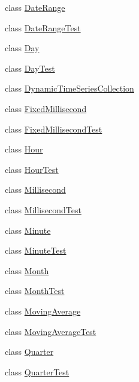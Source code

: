 \begin{DoxyCompactItemize}
\item 
class \mbox{\hyperlink{classorg_1_1jfree_1_1data_1_1time_1_1_date_range}{Date\+Range}}
\item 
class \mbox{\hyperlink{classorg_1_1jfree_1_1data_1_1time_1_1_date_range_test}{Date\+Range\+Test}}
\item 
class \mbox{\hyperlink{classorg_1_1jfree_1_1data_1_1time_1_1_day}{Day}}
\item 
class \mbox{\hyperlink{classorg_1_1jfree_1_1data_1_1time_1_1_day_test}{Day\+Test}}
\item 
class \mbox{\hyperlink{classorg_1_1jfree_1_1data_1_1time_1_1_dynamic_time_series_collection}{Dynamic\+Time\+Series\+Collection}}
\item 
class \mbox{\hyperlink{classorg_1_1jfree_1_1data_1_1time_1_1_fixed_millisecond}{Fixed\+Millisecond}}
\item 
class \mbox{\hyperlink{classorg_1_1jfree_1_1data_1_1time_1_1_fixed_millisecond_test}{Fixed\+Millisecond\+Test}}
\item 
class \mbox{\hyperlink{classorg_1_1jfree_1_1data_1_1time_1_1_hour}{Hour}}
\item 
class \mbox{\hyperlink{classorg_1_1jfree_1_1data_1_1time_1_1_hour_test}{Hour\+Test}}
\item 
class \mbox{\hyperlink{classorg_1_1jfree_1_1data_1_1time_1_1_millisecond}{Millisecond}}
\item 
class \mbox{\hyperlink{classorg_1_1jfree_1_1data_1_1time_1_1_millisecond_test}{Millisecond\+Test}}
\item 
class \mbox{\hyperlink{classorg_1_1jfree_1_1data_1_1time_1_1_minute}{Minute}}
\item 
class \mbox{\hyperlink{classorg_1_1jfree_1_1data_1_1time_1_1_minute_test}{Minute\+Test}}
\item 
class \mbox{\hyperlink{classorg_1_1jfree_1_1data_1_1time_1_1_month}{Month}}
\item 
class \mbox{\hyperlink{classorg_1_1jfree_1_1data_1_1time_1_1_month_test}{Month\+Test}}
\item 
class \mbox{\hyperlink{classorg_1_1jfree_1_1data_1_1time_1_1_moving_average}{Moving\+Average}}
\item 
class \mbox{\hyperlink{classorg_1_1jfree_1_1data_1_1time_1_1_moving_average_test}{Moving\+Average\+Test}}
\item 
class \mbox{\hyperlink{classorg_1_1jfree_1_1data_1_1time_1_1_quarter}{Quarter}}
\item 
class \mbox{\hyperlink{classorg_1_1jfree_1_1data_1_1time_1_1_quarter_test}{Quarter\+Test}}

\end{DoxyCompactItemize}
